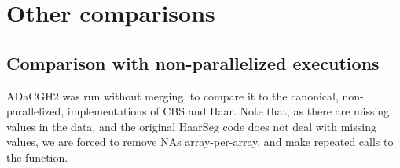 \documentclass[a4paper,11pt]{article}
\begin{document}
\begin{landscape}
\begin{center}

\clearpage

\clearpage

\clearpage

\end{center}
\end{landscape}


\clearpage
\section{Other comparisons}

\subsection{Comparison with non-parallelized executions}

ADaCGH2 was run without merging, to compare it to the canonical,
non-parallelized, implementations of CBS and Haar. Note that, as there are
missing values in the data, and the original HaarSeg code does not deal
with missing values, we are forced to remove NAs array-per-array, and make
repeated calls to the function.
\end{document}
